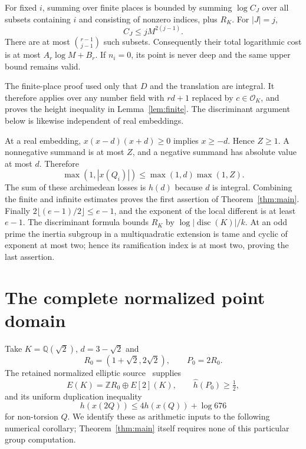\documentclass[11pt,a4paper]{article}
\newcommand{\Q}{\mathbb Q}\newcommand{\Z}{\mathbb Z}
\begin{document}
For fixed $i$, summing over finite places is bounded by summing
$\log C_J$ over all subsets containing $i$ and consisting of
nonzero indices, plus $R_K$. For $|J|=j$,
\[
 C_J\le jM^{2(j-1)}.
\]
There are at most $\binom{r-1}{j-1}$ such subsets.
Consequently their total logarithmic cost is at most
$A_r\log M+B_r$. If $n_i=0$, its point is never deep and the
same upper bound remains valid.

The finite-place proof used only that $D$ and the translation
are integral. It therefore applies over any number field with
$rd+1$ replaced by $c\in\mathcal O_K$, and proves the height
inequality in Lemma~\ref{lem:finite}. The discriminant argument
below is likewise independent of real embeddings.

At a real embedding, $x(x-d)(x+d)\ge0$ implies $x\ge-d$.
Hence $Z\ge1$. A nonnegative summand is at most $Z$, and a
negative summand has absolute value at most $d$. Therefore
\[
 \max(1,|x(Q_i)|)\le\max(1,d)\max(1,Z).
\]
The sum of these archimedean losses is $h(d)$ because $d$ is
integral. Combining the finite and infinite estimates proves the
first assertion of Theorem~\ref{thm:main}.
Finally $2\lfloor(e-1)/2\rfloor\le e-1$, and the exponent of
the local different is at least $e-1$. The discriminant formula
bounds $R_K$ by $\log|\operatorname{disc}(K)|/k$.
At an odd prime the inertia subgroup in a multiquadratic extension
is tame and cyclic of exponent at most two; hence its ramification
index is at most two, proving the last assertion.

\section{The complete normalized point domain}

Take $K=\Q(\sqrt2)$, $d=3-\sqrt2$ and
\[
 R_0=(1+\sqrt2,2\sqrt2),\qquad P_0=2R_0.
\]
The retained normalized elliptic source~\cite{Source} supplies
\[
 E(K)=\Z R_0\oplus E[2](K),\qquad
 \widehat h(P_0)\ge\tfrac12,
\]
and its uniform duplication inequality
\[
 h(x(2Q))\le4h(x(Q))+\log676
\]
for non-torsion $Q$. We identify these as arithmetic inputs to
the following numerical corollary; Theorem~\ref{thm:main} itself
requires none of this particular group computation.
\end{document}
